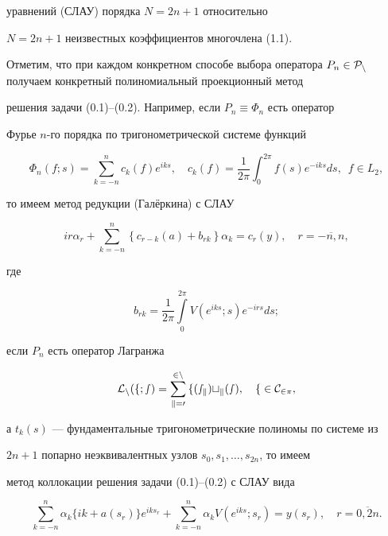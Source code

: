 уравнений (СЛАУ) порядка $N=2n+1$ относительно


$N=2n+1$ неизвестных коэффициентов многочлена (1.1).





Отметим, что при каждом конкретном способе выбора оператора $P_n\in


\rukopis{P}_n$ получаем конкретный полиномиальный проекционный метод


решения задачи (0.1)--(0.2). Например, если $P_n\equiv \Phi_n$ есть оператор


Фурье $n$-го порядка по тригонометрической системе функций


\begin{equation}


\Phi_n(f;s)=\sum_{k=-n}^nc_k(f) e^{iks},\quad


c_k(f)= \frac{1}{2\pi }\int_0^{2\pi }f(s) e^{-iks} ds,


\ \; f\in L_2,


\end{equation}


то имеем метод редукции (Гал\"еркина) с СЛАУ


\begin{equation}


ir\alpha_r+\sum_{k=-n}^n\left\{ c_{r-k}(a)+b_{rk}\right\} \alpha_k=


c_r(y),\quad r=\overline{-n,n},


\end{equation}


где


$$


b_{rk}=\frac{1}{2\pi}\int\limits_0^{2\pi}V(e^{iks};s)e^{-irs}ds;


$$


если $P_n$ есть оператор Лагранжа


\begin{equation}


\rukopis{L}_n(f;s)=\sum_{k=0}^{2n}f(s_k) t_k(s),\quad f\in C_{2\pi},


\end{equation}


а $t_k(s)$ --- фундаментальные тригонометрические полиномы по системе из


$2n+1$ попарно неэквивалентных узлов $s_0,s_1, \dotsc ,s_{2n}$, то имеем


метод коллокации решения задачи (0.1)--(0.2) с СЛАУ вида


\begin{equation}


\sum_{k=-n}^n\alpha_k\{ ik+a(s_r)\} e^{iks_r}+


\sum_{k=-n}^n\alpha_k V(e^{iks};s_r)= y(s_r),\quad r=\overline{0,2n}.


\end{equation}


